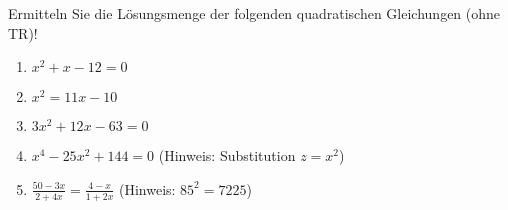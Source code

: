 \item Ermitteln Sie die Lösungsmenge der folgenden quadratischen Gleichungen (ohne TR)!

\begin{enumerate}
\item $x^2+x-12 = 0$
\item $x^2 = 11x -10$
\item $3x^2+12x-63 = 0$
\item $x^4-25x^2+144 = 0$ (Hinweis: Substitution $z=x^2$)
\item $\frac{50-3x}{2+4x} = \frac{4-x}{1+2x}$ (Hinweis: $85^2=7225$)
\end{enumerate}

